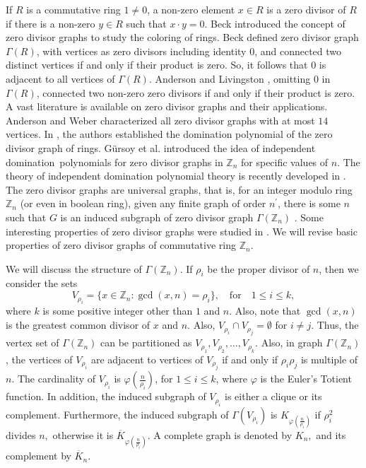 \documentclass[12pt,twoside]{article}
\begin{document}
If $ R $ is a commutative ring $1\neq 0$, a non-zero element $ x\in R $ is a zero divisor of $ R $ if there is a non-zero $ y\in R$ such that $ x\cdot y=0. $ Beck \cite{ib} introduced the concept of zero divisor graphs to study the coloring of rings. Beck defined zero divisor graph $\varGamma(R)$, with vertices as zero divisors including identity $0$, and connected two distinct vertices if and only if their product is zero. So, it follows that $0$ is adjacent to all vertices of $\varGamma(R)$. 
Anderson and Livingston \cite{al}, omitting $ 0 $ in $\varGamma(R)$, connected two non-zero zero divisors if and only if their product is zero.
A vast literature is available on zero divisor graphs and their applications.  Anderson and Weber \cite{anderson2019} characterized all zero divisor graphs with at most $14$ vertices.  In \cite{alikhanizd}, the authors established the domination polynomial of the zero divisor graph of rings. Gürsoy et al.  \cite{gursoy} introduced the idea of independent domination polynomials for zero divisor graphs in $\mathbb{Z}_{n}$ for specific values of $n.$ The theory of independent domination polynomial theory is recently developed in \cite{bilaltcs}. The zero divisor graphs are universal graphs, that is, for an integer modulo ring $\mathbb{Z}_{n}$ (or even in boolean ring), given any finite graph of order $n^{\prime}$, there is some $n$ such that $G$ is an induced subgraph of zero divisor graph $ \varGamma(\mathbb{Z}_{n})$ \cite{arunkumara,Andersonbook}. Some interesting properties of zero divisor graphs were studied in \cite{al,asir2}. We will revise basic properties of zero divisor graphs of commutative ring $\mathbb{Z}_{n}.$


We will discuss the structure of $\varGamma(\mathbb{Z}_{n})$. If  $ \rho_{i}$ be the proper divisor of $n$, then we consider the sets
$$ V_{\rho_{i}}= \{ x\in \mathbb{Z}_{n} : \gcd(x,n)=\rho_{i} \}, \quad \text{for}\quad  1\leq i \leq k, $$
where $k$ is some positive integer other than $1$ and $n.$  Also, note that $ \gcd(x,n) $ is the greatest common divisor of $ x $ and $ n. $
Also, $ V_{\rho_{i}} \cap V_{\rho_{j}}=\emptyset$ for $ i\neq j $. Thus, the vertex set of  $\varGamma(\mathbb{Z}_{n})$  can be partitioned as $ V_{\rho_{1}}, V_{\rho_{2}}, \dots, V_{\rho_{k}}$. Also,  in graph $\varGamma(\mathbb{Z}_{n})$, the vertices of $ V_{\rho_{i}} $ are adjacent to vertices of $ V_{\rho_{j}}  $  if and only if $ \rho_{i}\rho_{j}$ is multiple of $n.$ The cardinality of $V_{\rho_{i}} $ is $\varphi\left( \tfrac{n}{\rho_{i}}\right)$, for $ 1\leq i \leq k $, where $\varphi$ is the Euler's Totient function.  In addition, the induced subgraph of $ V_{\rho_{i}} $ is either a clique or its complement.
Furthermore, the induced subgraph of $ \varGamma(V_{\rho_i}) $ is $ K_{\varphi\left (\frac{n}{\rho_{i}}\right )} $ if $ \rho_{i}^{2} $ divides $ n, $ otherwise it is $\overline{K}_{\varphi\left (\frac{n}{\rho_{i}}\right )}$. A complete graph is denoted by $K_{n},$ and its complement by $\overline{K}_{n}.$
\end{document}
